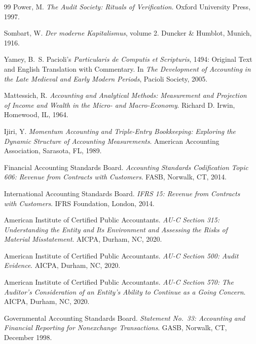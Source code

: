 \documentclass[11pt,a4paper]{article}
\theoremstyle{definition}
\theoremstyle{remark}
\begin{document}
\begin{thebibliography}{99}
Power, M.
\newblock \emph{The Audit Society: Rituals of Verification}.
\newblock Oxford University Press, 1997.

Sombart, W.
\newblock \emph{Der moderne Kapitalismus}, volume 2.
\newblock Duncker \& Humblot, Munich, 1916.

Yamey, B.~S.
\newblock Pacioli's \emph{Particularis de Computis et
  Scripturis}, 1494: Original Text and English Translation
  with Commentary.
\newblock In \emph{The Development of Accounting in the
  Late Medieval and Early Modern Periods}, Pacioli Society,
  2005.

Mattessich, R.
\newblock \emph{Accounting and Analytical Methods: Measurement and
  Projection of Income and Wealth in the Micro- and Macro-Economy}.
\newblock Richard D. Irwin, Homewood, IL, 1964.

Ijiri, Y.
\newblock \emph{Momentum Accounting and Triple-Entry Bookkeeping:
  Exploring the Dynamic Structure of Accounting Measurements}.
\newblock American Accounting Association, Sarasota, FL, 1989.

Financial Accounting Standards Board.
\newblock \emph{Accounting Standards Codification Topic 606:
  Revenue from Contracts with Customers}.
\newblock FASB, Norwalk, CT, 2014.

International Accounting Standards Board.
\newblock \emph{IFRS 15: Revenue from Contracts with Customers}.
\newblock IFRS Foundation, London, 2014.

American Institute of Certified Public Accountants.
\newblock \emph{AU-C Section 315: Understanding the Entity and Its
  Environment and Assessing the Risks of Material Misstatement}.
\newblock AICPA, Durham, NC, 2020.

American Institute of Certified Public Accountants.
\newblock \emph{AU-C Section 500: Audit Evidence}.
\newblock AICPA, Durham, NC, 2020.

American Institute of Certified Public Accountants.
\newblock \emph{AU-C Section 570: The Auditor's Consideration of
  an Entity's Ability to Continue as a Going Concern}.
\newblock AICPA, Durham, NC, 2020.

Governmental Accounting Standards Board.
\newblock \emph{Statement No.~33: Accounting and Financial Reporting
  for Nonexchange Transactions}.
\newblock GASB, Norwalk, CT, December 1998.


\end{thebibliography}
\end{document}
